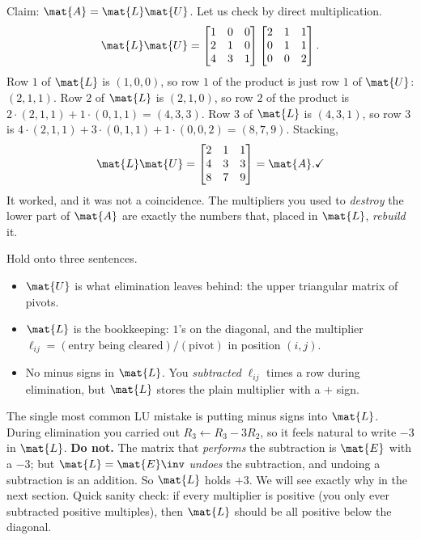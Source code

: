 Claim: $\mat{A} = \mat{L}\mat{U}$. Let us check by direct multiplication.
\[
  \mat{L}\mat{U}
  = \begin{bmatrix} 1 & 0 & 0 \\ 2 & 1 & 0 \\ 4 & 3 & 1 \end{bmatrix}
    \begin{bmatrix} 2 & 1 & 1 \\ 0 & 1 & 1 \\ 0 & 0 & 2 \end{bmatrix}.
\]
Row $1$ of $\mat{L}$ is $(1,0,0)$, so row $1$ of the product is just row $1$ of $\mat{U}$:
$(2,1,1)$. Row $2$ of $\mat{L}$ is $(2,1,0)$, so row $2$ of the product is
$2\cdot(2,1,1) + 1\cdot(0,1,1) = (4,3,3)$. Row $3$ of $\mat{L}$ is $(4,3,1)$, so row $3$ is
$4\cdot(2,1,1) + 3\cdot(0,1,1) + 1\cdot(0,0,2) = (8,7,9)$. Stacking,
\[
  \mat{L}\mat{U} = \begin{bmatrix} 2 & 1 & 1 \\ 4 & 3 & 3 \\ 8 & 7 & 9 \end{bmatrix} = \mat{A}. \checkmark
\]
It worked, and it was not a coincidence. The multipliers you used to \emph{destroy} the
lower part of $\mat{A}$ are exactly the numbers that, placed in $\mat{L}$,
\emph{rebuild} it.

\begin{focusbox}
Hold onto three sentences.
\begin{itemize}
  \item $\mat{U}$ is what elimination leaves behind: the upper triangular matrix of pivots.
  \item $\mat{L}$ is the bookkeeping: $1$'s on the diagonal, and the multiplier
        $\ell_{ij}=(\text{entry being cleared})/(\text{pivot})$ in position $(i,j)$.
  \item No minus signs in $\mat{L}$. You \emph{subtracted} $\ell_{ij}$ times a row during
        elimination, but $\mat{L}$ stores the plain multiplier with a $+$ sign.
\end{itemize}
\end{focusbox}

\begin{trapbox}
The single most common LU mistake is putting minus signs into $\mat{L}$. During elimination
you carried out $R_3 \leftarrow R_3 - 3R_2$, so it feels natural to write $-3$ in $\mat{L}$.
\textbf{Do not.} The matrix that \emph{performs} the subtraction is $\mat{E}$ with a $-3$;
but $\mat{L} = \mat{E}\inv$ \emph{undoes} the subtraction, and undoing a subtraction is an
addition. So $\mat{L}$ holds $+3$. We will see exactly why in the next section. Quick sanity
check: if every multiplier is positive (you only ever subtracted positive multiples), then
$\mat{L}$ should be all positive below the diagonal.
\end{trapbox}

